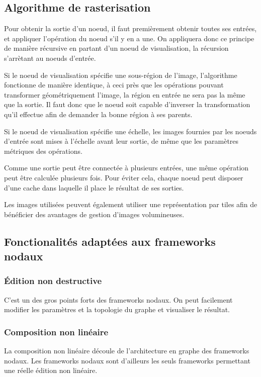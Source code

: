 		\subsection{Algorithme de rasterisation}
			Pour obtenir la sortie d'un noeud, il faut premièrement obtenir toutes ses entrées, et appliquer l'opération du
			noeud s'il y en a une. On appliquera donc ce principe de manière récursive en partant d'un noeud de visualisation,
			la récursion s'arrètant au noeuds d'entrée.

			Si le noeud de visualisation spécifie une sous-région de l'image, l'algorithme fonctionne de manière identique, à
			ceci près que les opérations pouvant transformer géométriquement l'image, la région en entrée ne sera pas la même que
			la sortie. Il faut donc que le noeud soit capable d'inverser la transformation qu'il effectue afin de demander la bonne
			région à ses parents. 

			Si le noeud de visualisation spécifie une échelle, les images fournies par les noeuds d'entrée sont mises à l'échelle avant
			leur sortie, de même que les paramètres métriques des opérations. 

			Comme une sortie peut être connectée à plusieurs entrées, une même opération peut être calculée plusieurs fois. Pour éviter
			cela, chaque noeud peut disposer d'une cache dans laquelle il place le résultat de ses sorties. 

			Les images utilisées peuvent également utiliser une représentation par tiles afin de bénéficier des avantages de gestion d'images
			volumineuses.

		\subsection{Fonctionalités adaptées aux frameworks nodaux}
			\subsubsection{Édition non destructive}
				C'est un des gros points forts des frameworks nodaux. On peut facilement modifier les paramètres et la topologie du graphe
				et visualiser le résultat.
			\subsubsection{Composition non linéaire}
				La composition non linéaire découle de l'architecture en graphe des frameworks nodaux. Les frameworks nodaux sont d'ailleurs
				les seuls frameworks permettant une réelle édition non linéaire. 
